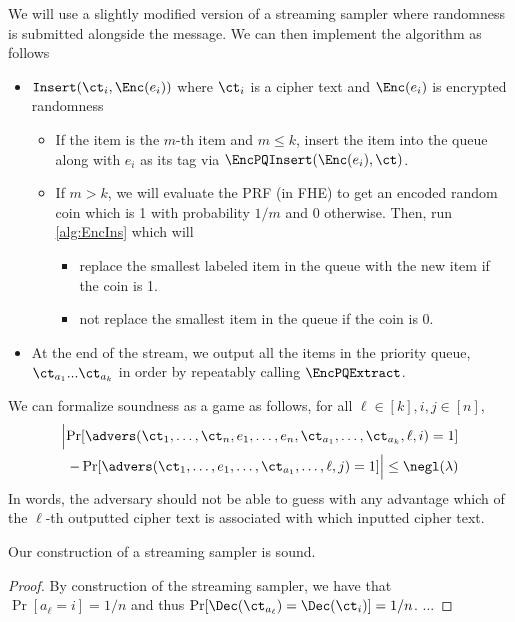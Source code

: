 We will use a slightly modified version of a streaming sampler where randomness is submitted alongside the message.
We can then implement the algorithm as follows
\begin{itemize}
	\item $\texttt{Insert}(\ct_i, \Enc(e_i))$ where $\ct_i$ is a cipher text and $\Enc(e_i)$ is encrypted randomness
	      \begin{itemize}
		      \item If the item is the $m$-th item and $m \leq k$, insert the item into the queue along with $e_i$ as its tag via $\EncPQInsert(\Enc(e_i), \ct)$.
		      \item If $m > k$, we will evaluate the PRF (in FHE) to get an encoded random coin which is 1 with probability $1/m$ and 0 otherwise.
		            Then, run \cref{alg:EncIns} which will
		            \begin{itemize}
			            \item replace the smallest labeled item in the queue with the new item if the coin is 1.
			            \item not replace the smallest item in the queue if the coin is 0.
		            \end{itemize}
	      \end{itemize}

	\item At the end of the stream, we output all the items in the priority queue, $\ct_{a_1} ... \ct_{a_k}$ in order
	      by repeatably calling $\EncPQExtract$.

\end{itemize}

We can formalize soundness as a game as follows, for all $\ell \in [k], i, j \in [n]$,
\begin{align}
	\Bigl\lvert
	\Pr[\advers(\ct_1, \dots, \ct_n, e_1, \dots, e_n, \ct_{a_1}, \dots, \ct_{a_k}, \ell, i) = 1] \\
	- \Pr[\advers(\ct_1, \dots, e_1, \dots, \ct_{a_1}, \dots, \ell, j) = 1]
	\Bigr\rvert \leq \negl(\lambda) \notag
\end{align}
In words, the adversary should not be able to guess with any advantage which of the $\ell$-th
outputted cipher text is associated with which inputted cipher text.

\begin{lemma}
	Our construction of a streaming sampler is sound.
	\begin{proof}
		By construction of the streaming sampler, we have that $\Pr[a_\ell = i] = 1/n$ and thus $\Pr[\Dec(\ct_{a_\ell}) = \Dec(\ct_i)] = 1/n$.
		...


	\end{proof}
\end{lemma}